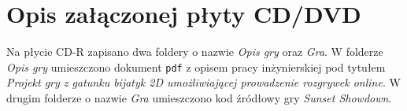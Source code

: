 \chapter{Opis załączonej płyty CD/DVD}
\label{chap:opis-plyty}
Na płycie CD-R zapisano dwa foldery o nazwie \emph{Opis gry} oraz \emph{Gra}. W folderze \emph{Opis gry} umieszczono dokument \texttt{pdf} z opisem pracy inżynierskiej pod tytułem \emph{Projekt gry z gatunku bijatyk 2D umożliwiającej prowadzenie rozgrywek online}. W drugim folderze o nazwie \emph{Gra} umieszczono kod źródłowy gry \emph{Sunset Showdown}.